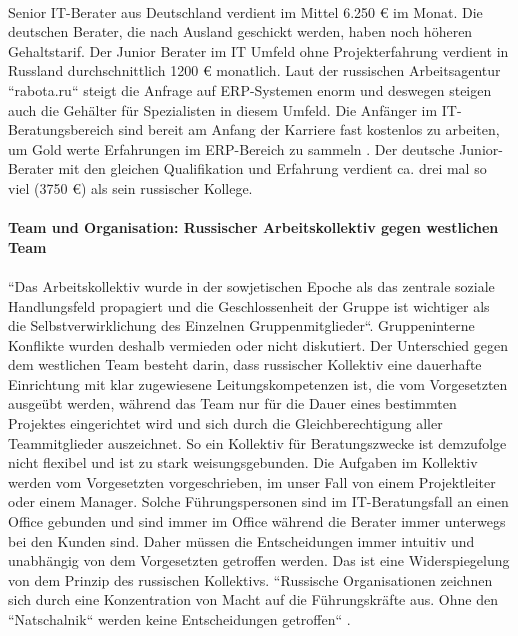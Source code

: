 \\
	Senior IT-Berater aus Deutschland verdient im Mittel 6.250 € im Monat\cite{GehaltSAPBerDE}. Die deutschen Berater, die nach Ausland geschickt werden, haben noch höheren Gehaltstarif. Der Junior Berater im IT Umfeld ohne Projekterfahrung  verdient in Russland durchschnittlich 1200 € monatlich\cite{GehaltSAPBerRU}. Laut der russischen Arbeitsagentur ``rabota.ru`` steigt die Anfrage auf ERP-Systemen enorm und deswegen steigen auch die Gehälter für Spezialisten in diesem Umfeld. Die Anfänger im IT-Beratungsbereich sind bereit am Anfang der Karriere fast kostenlos zu arbeiten, um Gold werte  Erfahrungen im ERP-Bereich zu sammeln \cite{RusGehRabota}.
	Der deutsche Junior-Berater mit den gleichen Qualifikation und Erfahrung verdient ca. drei mal so viel (3750 €) \cite{GehaltSAPBerDE} als sein russischer Kollege.\\
	\\
	 \newpage
	\textbf{Team und Organisation: Russischer Arbeitskollektiv gegen westlichen Team}\\
	\\
	``Das Arbeitskollektiv wurde in der sowjetischen 
	Epoche als das zentrale soziale Handlungsfeld propagiert und die Geschlossenheit der Gruppe ist wichtiger als die Selbstverwirklichung des Einzelnen Gruppenmitglieder``\cite{ProzessbeglBerRU}.
	Gruppeninterne Konflikte wurden deshalb vermieden oder nicht diskutiert. Der Unterschied gegen dem westlichen Team besteht darin, dass russischer Kollektiv eine dauerhafte Einrichtung mit klar zugewiesene Leitungskompetenzen ist, die vom Vorgesetzten ausgeübt werden, während das Team nur für die Dauer eines bestimmten Projektes eingerichtet wird und sich durch die Gleichberechtigung aller Teammitglieder auszeichnet.
	So ein Kollektiv für Beratungszwecke ist demzufolge nicht flexibel und ist zu stark weisungsgebunden. Die Aufgaben im Kollektiv werden vom Vorgesetzten vorgeschrieben, im unser Fall von einem Projektleiter oder einem Manager. Solche Führungspersonen sind im IT-Beratungsfall an einen Office gebunden und sind immer im Office während die Berater immer unterwegs bei den Kunden sind. Daher müssen die Entscheidungen immer intuitiv und unabhängig von dem Vorgesetzten getroffen werden. Das ist eine Widerspiegelung von dem Prinzip des russischen Kollektivs. ``Russische Organisationen zeichnen sich durch eine Konzentration von Macht auf die Führungskräfte aus. Ohne den ``Natschalnik`` werden keine Entscheidungen getroffen`` \cite{ProzessbeglBerRU}.
